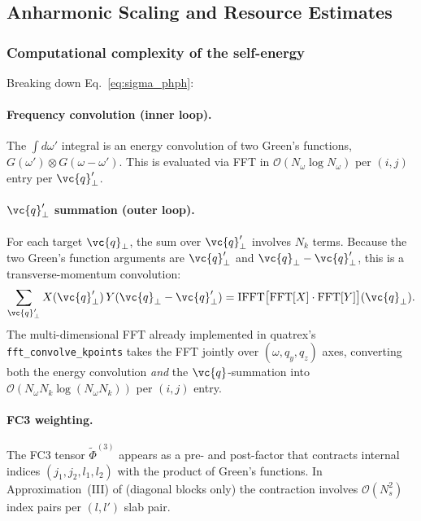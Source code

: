 \subsection{Anharmonic Scaling and Resource Estimates}
\label{sec:phph_scaling}

\subsubsection{Computational complexity of the self-energy}

Breaking down Eq.~\eqref{eq:sigma_phph}:

\paragraph{Frequency convolution (inner loop).}
The $\int d\omega'$ integral is an energy convolution of two Green's
functions, $G(\omega')\otimes G(\omega-\omega')$.  This is evaluated
via FFT in $\mathcal{O}(N_\omega\log N_\omega)$ per $(i,j)$ entry per
$\vc{q}'_\perp$.

\paragraph{$\vc{q}'_\perp$ summation (outer loop).}
For each target $\vc{q}_\perp$, the sum over $\vc{q}'_\perp$ involves
$N_k$ terms.  Because the two Green's function arguments are
$\vc{q}'_\perp$ and $\vc{q}_\perp-\vc{q}'_\perp$, this is a
transverse-momentum convolution:
\begin{equation}
  \sum_{\vc{q}'_\perp}
  X(\vc{q}'_\perp)\,Y(\vc{q}_\perp - \vc{q}'_\perp)
  = \mathrm{IFFT}\bigl[\mathrm{FFT}[X]\cdot\mathrm{FFT}[Y]\bigr](\vc{q}_\perp).
\end{equation}
The multi-dimensional FFT already implemented in quatrex's
\texttt{fft\_convolve\_kpoints} takes the FFT jointly over
$(\omega, q_y, q_z)$ axes, converting both the energy convolution
\emph{and} the $\vc{q}$-summation into
$\mathcal{O}(N_\omega N_k\log(N_\omega N_k))$ per $(i,j)$ entry.

\paragraph{FC3 weighting.}
The FC3 tensor $\tilde{\Phi}^{(3)}$ appears as a pre- and post-factor
that contracts internal indices $(j_1,j_2,l_1,l_2)$ with the product
of Green's functions.  In Approximation~(III) of \cite{guo_quantum_2020} (diagonal blocks
only) the contraction involves $\mathcal{O}(N_s^2)$ index pairs per
$(l,l')$ slab pair.

